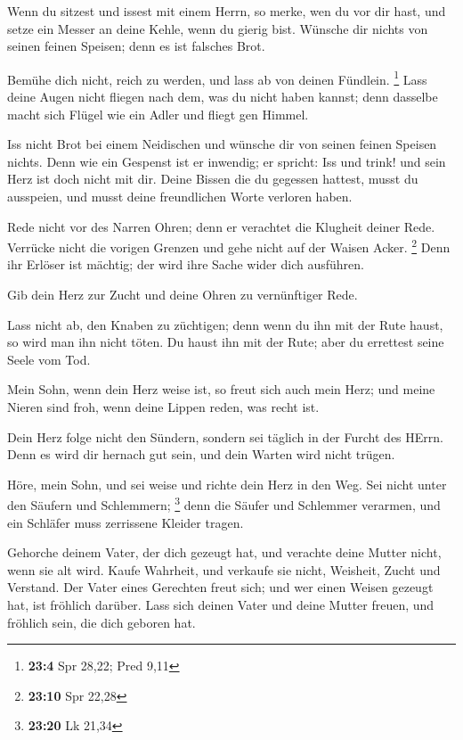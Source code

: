  Wenn du sitzest und issest mit einem Herrn, so merke, wen
du vor dir hast,  und setze ein Messer an deine Kehle,
wenn du gierig bist.  Wünsche dir nichts von seinen feinen
Speisen; denn es ist falsches Brot.

 Bemühe dich nicht, reich zu werden, und lass ab von
deinen Fündlein. \footnote{\textbf{23:4} Spr 28,22; Pred 9,11}
 Lass deine Augen nicht fliegen nach dem, was du nicht
haben kannst; denn dasselbe macht sich Flügel wie ein Adler und fliegt
gen Himmel.

 Iss nicht Brot bei einem Neidischen und wünsche dir von
seinen feinen Speisen nichts.  Denn wie ein Gespenst ist
er inwendig; er spricht: Iss und trink! und sein Herz ist doch nicht mit
dir.  Deine Bissen die du gegessen hattest, musst du
ausspeien, und musst deine freundlichen Worte verloren haben.

 Rede nicht vor des Narren Ohren; denn er verachtet die
Klugheit deiner Rede.  Verrücke nicht die vorigen Grenzen
und gehe nicht auf der Waisen Acker. \footnote{\textbf{23:10} Spr 22,28}
 Denn ihr Erlöser ist mächtig; der wird ihre Sache wider
dich ausführen.

 Gib dein Herz zur Zucht und deine Ohren zu vernünftiger
Rede.

 Lass nicht ab, den Knaben zu züchtigen; denn wenn du ihn
mit der Rute haust, so wird man ihn nicht töten.  Du
haust ihn mit der Rute; aber du errettest seine Seele vom Tod.

 Mein Sohn, wenn dein Herz weise ist, so freut sich auch
mein Herz;  und meine Nieren sind froh, wenn deine Lippen
reden, was recht ist.

 Dein Herz folge nicht den Sündern, sondern sei täglich
in der Furcht des HErrn.  Denn es wird dir hernach gut
sein, und dein Warten wird nicht trügen.

 Höre, mein Sohn, und sei weise und richte dein Herz in
den Weg.  Sei nicht unter den Säufern und Schlemmern;
\footnote{\textbf{23:20} Lk 21,34}  denn die Säufer und
Schlemmer verarmen, und ein Schläfer muss zerrissene Kleider tragen.

 Gehorche deinem Vater, der dich gezeugt hat, und
verachte deine Mutter nicht, wenn sie alt wird.  Kaufe
Wahrheit, und verkaufe sie nicht, Weisheit, Zucht und Verstand.
 Der Vater eines Gerechten freut sich; und wer einen
Weisen gezeugt hat, ist fröhlich darüber.  Lass sich
deinen Vater und deine Mutter freuen, und fröhlich sein, die dich
geboren hat.

